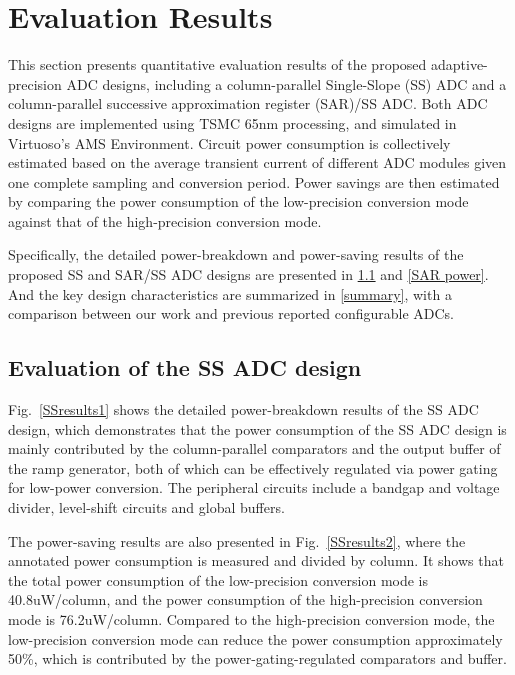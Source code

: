 \section{Evaluation Results}\label{result}

This section presents quantitative evaluation results of the proposed adaptive-precision ADC 
designs, including a column-parallel Single-Slope (SS) ADC and a column-parallel successive 
approximation register (SAR)/SS ADC. Both ADC designs are implemented using TSMC 65nm processing,
and simulated in Virtuoso’s AMS Environment. Circuit power consumption is collectively estimated
based on the average transient current of different ADC modules given one complete sampling and 
conversion period. Power savings are then estimated by comparing the power consumption of the
low-precision conversion mode against that of the high-precision conversion mode. 

Specifically, the detailed power-breakdown and power-saving results of the proposed SS and SAR/SS ADC designs are presented in \ref{SS power} and \ref{SAR power}. And the key design characteristics are summarized in \ref{summary}, with a comparison between our work and previous reported configurable ADCs.

\subsection{Evaluation of the SS ADC design}\label{SS power}

Fig.~\ref{SSresults1} shows the detailed power-breakdown results of the SS ADC design,
which demonstrates that the power consumption of the SS ADC design is mainly contributed by 
the  column-parallel comparators and the output buffer of the ramp generator, both of which 
can be effectively regulated via power gating for low-power conversion. The peripheral circuits include a bandgap and voltage divider, level-shift circuits and global buffers.

The power-saving results are also presented in Fig.~\ref{SSresults2}, where the annotated power consumption is measured and divided by column. It shows that the total power consumption of the low-precision conversion mode is 40.8uW/column, and the power consumption of the high-precision conversion mode is 76.2uW/column. 
Compared to the high-precision conversion mode, the low-precision conversion mode can reduce 
the power consumption approximately 50\%, which is contributed by the power-gating-regulated comparators and buffer.

